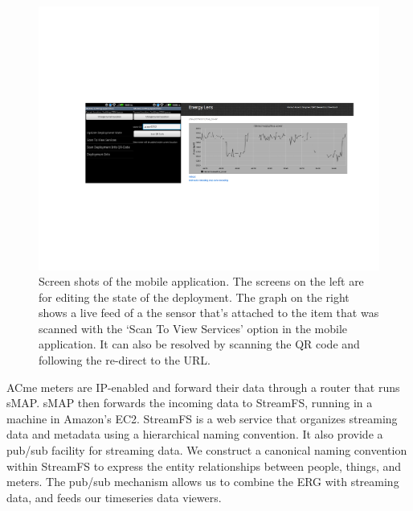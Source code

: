 \begin{figure}[htb!]
\begin{center}
\includegraphics[width=\textwidth]{figs/mobileapp}
\caption{Screen shots of the mobile application.  The screens on the left are for editing the state of the deployment.
The graph on the right shows a live feed of a the sensor that's attached to the item that was scanned with the `Scan To
View Services' option in the mobile application.  It can also be resolved by scanning the QR code and following the re-direct
to the URL.}
\label{fig:mobileapp}
\end{center}
\end{figure}

ACme meters are IP-enabled and forward their data through a router that runs sMAP.  sMAP then forwards the incoming data
to StreamFS, running in a machine in Amazon's EC2.  StreamFS is a web service that organizes streaming data and metadata using
a hierarchical naming convention.  It also provide a pub/sub facility for streaming data.  We construct 
a canonical naming convention within StreamFS to express the entity relationships between people, things, and meters.  The pub/sub
mechanism allows us to combine the ERG with streaming data, and feeds our timeseries data viewers.















